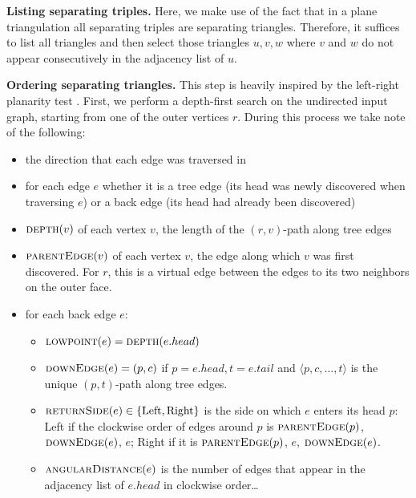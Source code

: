 \documentclass[a4paper]{article}
\begin{document}
\medskip\noindent
\textbf{Listing separating triples.}
Here, we make use of the fact that in a plane triangulation all separating
triples are separating triangles.
Therefore, it suffices to list all triangles \cite{triangles} and then select
those triangles $u,v,w$ where $v$ and $w$ do not appear consecutively in the
adjacency list of $u$.

\medskip\noindent
\textbf{Ordering separating triangles.}
This step is heavily inspired by the left-right planarity test \cite{lrpt}.
First, we perform a depth-first search on the undirected input graph, starting
from one of the outer vertices $r$. During this process we take note of the
following:
\begin{itemize}
    \item
        the direction that each edge was traversed in
    \item
        for each edge $e$ whether it is a tree edge (its head was newly
        discovered when traversing $e$) or a back edge (its head had already
        been discovered)
    \item
        $\textsc{depth}(v)$ of each vertex $v$, the length of the $(r,v)$-path
        along tree edges
    \item
        $\textsc{parentEdge}(v)$ of each vertex $v$, the edge along which $v$
        was first discovered.
        For $r$, this is a virtual edge between the edges to its two neighbors
        on the outer face.
    \item for each back edge $e$:
        \begin{itemize}
            \item
                $\textsc{lowpoint}(e) = \textsc{depth}(e.head)$
            \item
                $\textsc{downEdge}(e) = (p,c)$
                if $p = e.head, t = e.tail$
                and $\langle p,c,\dots,t \rangle$ is the unique $(p,t)$-path along tree
                edges.
            \item
                $\textsc{returnSide}(e) \in \{\mathrm{Left}, \mathrm{Right}\}$
                is the side on
                which $e$ enters its head $p$: Left if the clockwise
                order of edges around $p$ is $\textsc{parentEdge}(p)$,
                $\textsc{downEdge}(e)$, $e$; Right if it is
                $\textsc{parentEdge}(p)$, $e$, $\textsc{downEdge}(e)$.
            \item
                $\textsc{angularDistance}(e)$ is the number of edges that appear in the
                adjacency list of $e.head$ in clockwise order\dots

\end{itemize}
\end{itemize}
\end{document}
